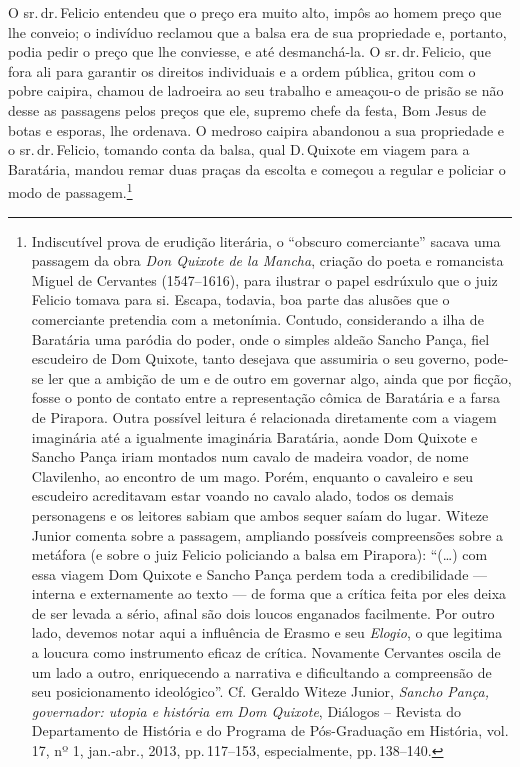 O sr.\,dr.\,Felicio entendeu que o preço era muito alto, impôs ao homem
preço que lhe conveio; o indivíduo reclamou que a balsa era de sua
propriedade e, portanto, podia pedir o preço que lhe conviesse, e até
desmanchá-la. O sr.\,dr.\,Felicio, que fora ali para garantir os direitos
individuais e a ordem pública, gritou com o pobre caipira, chamou de
ladroeira ao seu trabalho e ameaçou-o de prisão se não desse as
passagens pelos preços que ele, supremo chefe da festa, Bom Jesus de
botas e esporas, lhe ordenava. O medroso caipira abandonou a sua
propriedade e o sr.\,dr.\,Felicio, tomando conta da balsa, qual D.\,Quixote
em viagem para a Baratária, mandou remar duas praças da escolta e
começou a regular e policiar o modo de passagem.\footnote{ Indiscutível
  prova de erudição literária, o ``obscuro comerciante'' sacava uma
  passagem da obra \emph{Don Quixote de la Mancha}, criação do poeta e
  romancista Miguel de Cervantes (1547--1616), para ilustrar o papel
  esdrúxulo que o juiz Felicio tomava para si. Escapa, todavia, boa
  parte das alusões que o comerciante pretendia com a metonímia.
  Contudo, considerando a ilha de Baratária uma paródia do poder, onde o
  simples aldeão Sancho Pança, fiel escudeiro de Dom Quixote, tanto
  desejava que assumiria o seu governo, pode-se ler que a ambição de um
  e de outro em governar algo, ainda que por ficção, fosse o ponto de
  contato entre a representação cômica de Baratária e a farsa de
  Pirapora. Outra possível leitura é relacionada diretamente com a
  viagem imaginária até a igualmente imaginária Baratária, aonde Dom
  Quixote e Sancho Pança iriam montados num cavalo de madeira voador, de
  nome Clavilenho, ao encontro de um mago. Porém, enquanto o cavaleiro e
  seu escudeiro acreditavam estar voando no cavalo alado, todos os
  demais personagens e os leitores sabiam que ambos sequer saíam do
  lugar. Witeze Junior comenta sobre a passagem, ampliando possíveis
  compreensões sobre a metáfora (e sobre o juiz Felicio policiando a
  balsa em Pirapora): ``(\ldots{}) com essa viagem Dom Quixote e Sancho Pança
  perdem toda a credibilidade --- interna e externamente ao texto --- de
  forma que a crítica feita por eles deixa de ser levada a sério, afinal
  são dois loucos enganados facilmente. Por outro lado, devemos notar
  aqui a influência de Erasmo e seu \emph{Elogio}, o que legitima a
  loucura como instrumento eficaz de crítica. Novamente Cervantes oscila
  de um lado a outro, enriquecendo a narrativa e dificultando a
  compreensão de seu posicionamento ideológico''. Cf. Geraldo Witeze
  Junior, \emph{Sancho Pança, governador: utopia e história em Dom
  Quixote}, Diálogos -- Revista do Departamento de História e do Programa
  de Pós-Graduação em História, vol.\,17, nº 1, jan.-abr., 2013,
  pp.\,117--153, especialmente, pp.\,138--140.}

